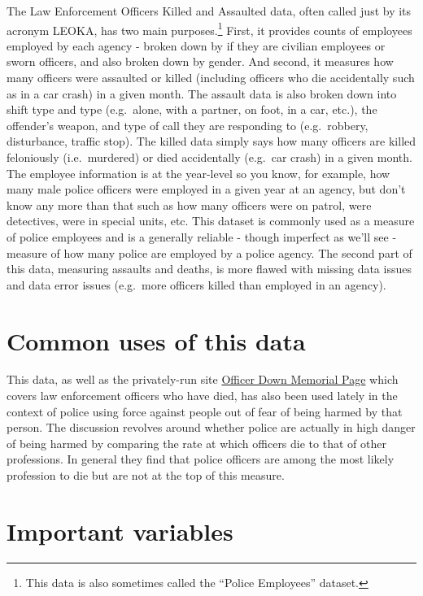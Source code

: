 \documentclass[
  12pt,
  openany]{book}
\begin{document}
The Law Enforcement Officers Killed and Assaulted data, often called just by its acronym LEOKA, has two main purposes.\footnote{This data is also sometimes called the ``Police Employees'' dataset.} First, it provides counts of employees employed by each agency - broken down by if they are civilian employees or sworn officers, and also broken down by gender. And second, it measures how many officers were assaulted or killed (including officers who die accidentally such as in a car crash) in a given month. The assault data is also broken down into shift type and type (e.g.~alone, with a partner, on foot, in a car, etc.), the offender's weapon, and type of call they are responding to (e.g.~robbery, disturbance, traffic stop). The killed data simply says how many officers are killed feloniously (i.e.~murdered) or died accidentally (e.g.~car crash) in a given month. The employee information is at the year-level so you know, for example, how many male police officers were employed in a given year at an agency, but don't know any more than that such as how many officers were on patrol, were detectives, were in special units, etc. This dataset is commonly used as a measure of police employees and is a generally reliable - though imperfect as we'll see - measure of how many police are employed by a police agency. The second part of this data, measuring assaults and deaths, is more flawed with missing data issues and data error issues (e.g.~more officers killed than employed in an agency).

\hypertarget{common-uses-of-this-data}{%
\section{Common uses of this data}\label{common-uses-of-this-data}}

This data, as well as the privately-run site \href{https://www.odmp.org/}{Officer Down Memorial Page} which covers law enforcement officers who have died, has also been used lately in the context of police using force against people out of fear of being harmed by that person. The discussion revolves around whether police are actually in high danger of being harmed by comparing the rate at which officers die to that of other professions. In general they find that police officers are among the most likely profession to die but are not at the top of this measure.

\hypertarget{important-variables-1}{%
\section{Important variables}\label{important-variables-1}}
\end{document}
